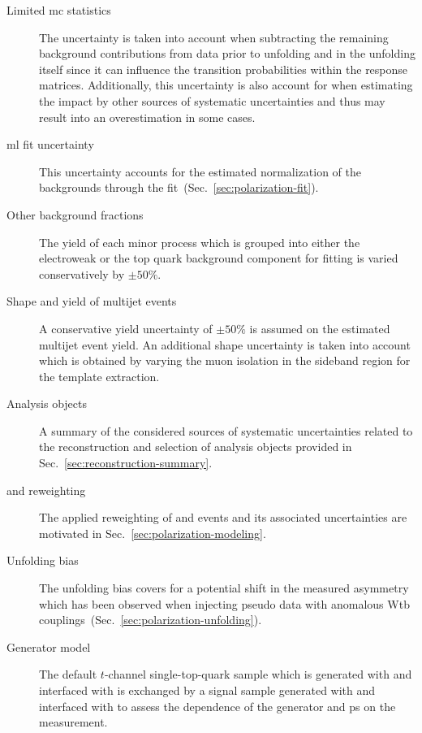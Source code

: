 \begin{description}
\item[Limited \gls{mc} statistics]  The uncertainty is taken into account when subtracting the remaining background contributions from data prior to unfolding and in the unfolding itself since it can influence the transition probabilities within the response matrices. Additionally, this uncertainty is also account for when estimating the impact by other sources of systematic uncertainties and thus may result into an overestimation in some cases.

\item[\Gls{ml} fit uncertainty] This uncertainty accounts for the estimated normalization of the backgrounds through the fit~(Sec.~\ref{sec:polarization-fit}).

\item[Other background fractions] The yield of each minor process which is grouped into either the electroweak or the top quark background component for fitting is varied conservatively by $\pm50\%$.

\item[Shape and yield of multijet events] A conservative yield uncertainty of $\pm50\%$ is assumed on the estimated multijet event yield. An additional shape uncertainty is taken into account which is obtained by varying the muon isolation in the sideband region for the template extraction.

\item[Analysis objects] A summary of the considered sources of systematic uncertainties related to the reconstruction and selection of analysis objects provided in Sec.~\ref{sec:reconstruction-summary}.

\item[\wjets and \ttbar reweighting] The applied reweighting of \ttbar and \wjets events and its associated uncertainties are motivated in Sec.~\ref{sec:polarization-modeling}. 

\item[Unfolding bias] The unfolding bias covers for a potential shift in the measured asymmetry which has been observed when injecting pseudo data with anomalous Wtb couplings~(Sec.~\ref{sec:polarization-unfolding}).

\item[Generator model] The default $t$-channel single-top-quark sample which is generated with \POWHEG and interfaced with  is exchanged by a signal sample generated with \AMC and interfaced with  to assess the dependence of the generator and \gls{ps} on the measurement.


\end{description}
